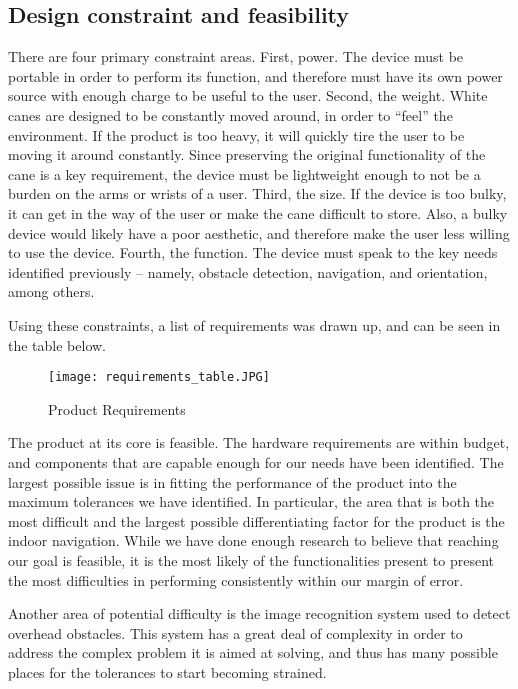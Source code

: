 \documentclass[letterpaper,12pt]{article}
\begin{document}
\subsection{Design constraint and feasibility}

There are four primary constraint areas. First, power. The device must be portable in order to perform its function, and therefore must have its own power source with enough charge to be useful to the user. 
Second, the weight. White canes are designed to be constantly moved around, in order to “feel” the environment. If the product is too heavy, it will quickly tire the user to be moving it around constantly. Since preserving the original functionality of the cane is a key requirement, the device must be lightweight enough to not be a burden on the arms or wrists of a user.
Third, the size. If the device is too bulky, it can get in the way of the user or make the cane difficult to store. Also, a bulky device would likely have a poor aesthetic, and therefore make the user less willing to use the device.
Fourth, the function. The device must speak to the key needs identified previously – namely, obstacle detection, navigation, and orientation, among others. \par
Using these constraints, a list of requirements was drawn up, and can be seen in the table below. \par

\begin{figure}[h]
\centering
\caption{Product Requirements}
\texttt{[image: requirements\_table.JPG]}
\end{figure}

The product at its core is feasible. The hardware requirements are within budget, and components that are capable enough for our needs have been identified. The largest possible issue is in fitting the performance of the product into the maximum tolerances we have identified. In particular, the area that is both the most difficult and the largest possible differentiating factor for the product is the indoor navigation. While we have done enough research to believe that reaching our goal is feasible, it is the most likely of the functionalities present to present the most difficulties in performing consistently within our margin of error.\par

Another area of potential difficulty is the image recognition system used to detect overhead obstacles. This system has a great deal of complexity in order to address the complex problem it is aimed at solving, and thus has many possible places for the tolerances to start becoming strained.\par
\end{document}
